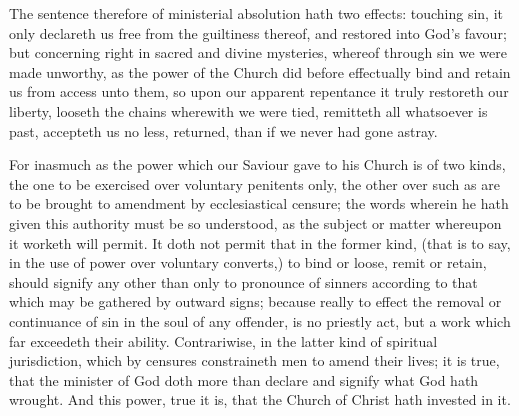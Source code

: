 The sentence therefore of ministerial absolution hath two effects: touching sin, it only declareth us free from the guiltiness thereof, and restored into God’s favour; but concerning right in sacred and divine mysteries, whereof through sin we were made unworthy, as the power of the Church did before effectually bind and retain us from access unto them, so upon our apparent repentance it truly restoreth our liberty, looseth the chains wherewith we were tied, remitteth all whatsoever is past, accepteth us no less, returned, than if we never had gone astray.

For inasmuch as the power which our Saviour gave to his Church is of two kinds, the one to be exercised over voluntary penitents only, the other over such as are to be brought to amendment by ecclesiastical censure; the words wherein he hath given this authority must be so understood, as the subject or matter whereupon it worketh will permit. It doth not permit that in the former kind, (that is to say, in the use of power over voluntary converts,) to bind or loose, remit or retain, should signify any other than only to pronounce of sinners according to that which may be gathered by outward signs; because really to effect the removal or continuance of sin in the soul of any offender, is no priestly act, but a work which far exceedeth their ability. Contrariwise, in the latter  kind of spiritual jurisdiction, which by censures constraineth men to amend their lives; it is true, that the minister of God doth more than declare and signify what God hath wrought. And this power, true it is, that the Church of Christ hath invested in it.


